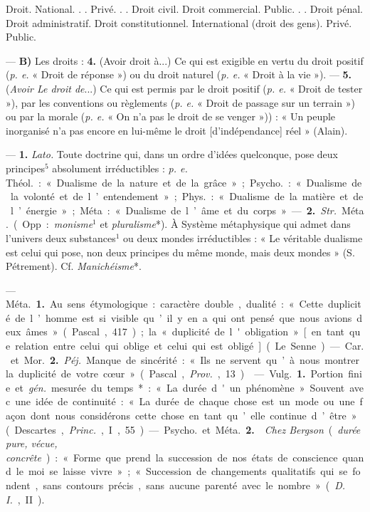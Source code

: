 \begin{itemize}[leftmargin=1cm, label=, itemsep=1pt]
Droit.
 National. . .
  Privé. . .
   Droit civil.
   Droit commercial.
  Public. . .
   Droit pénal.
   Droit administratif.
   Droit constitutionnel.
 International (droit des gens).
  Privé.
  Public.

— {\bf B)} Les droits : {\bf 4.} (Avoir droit
à...) Ce qui est exigible en vertu
du droit positif ({\it p. e.} « Droit de réponse ») ou du droit naturel ({\it p. e.}
« Droit à la vie »). — {\bf 5.} ({\it Avoir Le
droit de}...) Ce qui est permis par le
droit positif ({\it p. e.} « Droit de tester »),
par les conventions ou règlements
({\it p. e.} « Droit de passage sur un terrain ») ou par la morale ({\it p. e.} « On
n’a pas le droit de se venger »)) : « Un
peuple inorganisé n’a pas encore en
lui-même le droit [d'indépendance]
réel » (Alain).

 — {\bf 1.} {\it Lato.} Toute doctrine
qui, dans un ordre d'idées quelconque, pose deux principes$^5$ absolument irréductibles : {\it p. e.} \si{Théol.} :
« Dualisme de la nature et de la
grâce » ; \si{Psycho.} : « Dualisme de la
volonté et de l’entendement » ;
\si{Phys.} : « Dualisme de la matière et
de l’énergie » ; Méta : « Dualisme de
l’âme et du corps ».

— {\bf 2.} {\it Str.} \si{Méta.} (Opp. : {\it monisme}$^1$
et {\it pluralisme}*). À Système métaphysique qui admet dans l’univers deux
substances$^1$ ou deux mondes irréductibles : « Le véritable dualisme
est celui qui pose, non deux principes du même monde, mais deux
mondes » (S. Pétrement). Cf. {\it Manichéisme}*.

 — \si{Méta.} {\bf 1.} Au sens étymologique : caractère double, dualité :
« Cette duplicité de l’homme est si
visible qu’il y en a qui ont pensé
que nous avions deux âmes » (Pascal,
417); la « duplicité de l'obligation »
[en tant que relation entre celui qui
oblige et celui qui est obligé] (Le
Senne).

— \si{Car.} et \si{Mor.} {\bf 2.} {\it Péj.} Manque de
sincérité : « Ils ne servent qu’à nous
montrer la duplicité de votre cœur »
(Pascal, {\it Prov.}, 13).

 — \si{Vulg.} {\bf 1.} Portion finie et  {\it gén.}
mesurée du temps* : « La durée
d'un phénomène ». Souvent avec
une idée de continuité : « La durée
de chaque chose est un mode ou une
façon dont nous considérons cette
chose en tant qu’elle continue d’être»
(Descartes, {\it Princ.}, I, 55).

— \si{Psycho.} et \si{Méta.} {\bf 2.}  {\it Chez
Bergson} ({\it durée pure, vécue, concrête}) : « Forme que prend la succession de nos états de conscience
quand le moi se laisse vivre »; « Succession de changements qualitatifs
qui se fondent, sans contours précis,... sans aucune parenté avec le
nombre » ({\it D. I.}, II).


\end{itemize}
